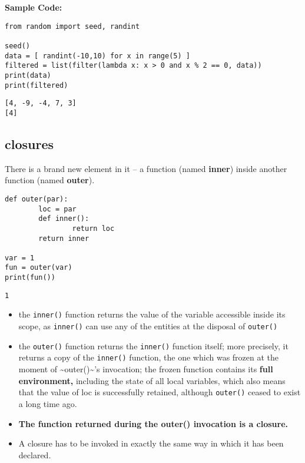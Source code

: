 \documentclass[11pt]{article}
\begin{document}
\textbf{Sample Code:}

\begin{verbatim}
from random import seed, randint

seed()
data = [ randint(-10,10) for x in range(5) ]
filtered = list(filter(lambda x: x > 0 and x % 2 == 0, data))
print(data)
print(filtered)
\end{verbatim}

\begin{verbatim}
[4, -9, -4, 7, 3]
[4]
\end{verbatim}
\vspace{10 mm}

\subsection{closures}
\label{sec:org5111981}
There is a brand new element in it – a function (named \textbf{inner}) inside
another function (named \textbf{outer}).

\begin{verbatim}
def outer(par):
        loc = par
        def inner():
                return loc
        return inner

var = 1
fun = outer(var)
print(fun())
\end{verbatim}

\begin{verbatim}
1
\end{verbatim}

\vspace{10 mm}

\begin{itemize}
\item the \texttt{inner()} function returns the value of the variable accessible
inside its scope, as \texttt{inner()} can use any of the entities at the
disposal of \texttt{outer()}
\item the \texttt{outer()} function returns the \texttt{inner()} function itself; more
precisely, it returns a copy of the \texttt{inner()} function, the one
which was frozen at the moment of \textasciitilde{}outer()\textasciitilde{}’s invocation; the frozen
function contains its \textbf{full environment,} including the state of all
local variables, which also means that the value of loc is
successfully retained, although \texttt{outer()} ceased to exist a long time
ago.

\item \textbf{The function returned during the outer() invocation is a closure.}

\item A closure has to be invoked in exactly the same way in which it has been declared.
\end{itemize}
\end{document}

